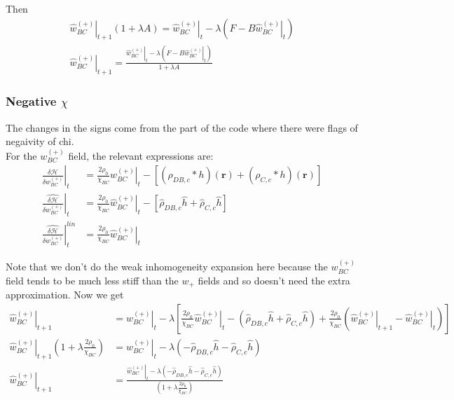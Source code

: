 \documentclass{article}
\begin{document}
  Then
  \begin{align*}
    \left. \hat{w}_{BC}^{(+)} \right|_{t+1} ( 1 + \lambda A ) =
      \left. \hat{w}_{BC}^{(+)} \right|_t
      - \lambda \left( F - B \left. \hat{w}_{BC}^{(+)} \right|_t \right) \\
    \left. \hat{w}_{BC}^{(+)} \right|_{t+1} =
    \frac{\left. \hat{w}_{BC}^{(+)} \right|_t - \lambda
            \left( F - B \left. \hat{w}_{BC}^{(+)} \right|_t \right)}
         {1 + \lambda A}
  \end{align*}
  
    \subsubsection{Negative $\chi$}
    The changes in the signs come from the part of the code where there were flags of negaivity of chi. \\
    For the $w_{BC}^{(+)}$ field, the relevant expressions are:
  \begin{align*}
    \left. \frac{\delta \mathcal{H}}{\delta  w_{BC}^{(+)} } \right|_t &=
      \frac{2\rho_0}{\chi_{BC}} \left. w_{BC}^{(+)} \right|_t
      -   [ (\rho_{DB,c} \ast h)(\mathbf{r})
            + (\rho_{C,c} \ast h)(\mathbf{r}) ] \\
      \left. \hat{\frac{\delta \mathcal{H}}{\delta w_{BC}^{(+)}}} \right|_t &=
      \frac{2\rho_0}{\chi_{BC}} \left. \hat{w}_{BC}^{(+)} \right|_t
      -   [ \hat{\rho}_{DB,c} \hat{h}
            + \hat{\rho}_{C,c} \hat{h} ] 
            \\
            \left.
            \hat{\frac{\delta \mathcal{H}}{\delta w_{BC}^{(+)}}}
            \right| ^{lin}_t &=
            \frac{2\rho_0}{\chi_{BC}} \left. \hat{w}_{BC}^{(+)} \right|_t
  \end{align*}
  
    Note that we don't do the weak inhomogeneity expansion here because the
  $w_{BC}^{(+)}$ field tends to be much less stiff than the $w_+$ fields and so
  doesn't need the extra approximation.
  Now we get
  \begin{align*}
  \left. \hat{w}_{BC}^{(+)} \right|_{t+1} &=
  \left. \hat{w}_{BC}^{(+)} \right|_t - \lambda \left[
  \frac{2\rho_0}{\chi_{BC}} \left. \hat{w}_{BC}^{(+)} \right|_t
  - ( \hat{\rho}_{DB,c} \hat{h}
  + \hat{\rho}_{C,c} \hat{h} )
  + \frac{2\rho_0}{\chi_{BC}}
  ( \left. \hat{w}_{BC}^{(+)}\right|_{t+1}
  - \left. \hat{w}_{BC}^{(+)} \right|_t
  )
  \right] \\
  \left. \hat{w}_{BC}^{(+)} \right|_{t+1} ( 1 + \lambda \frac{2
  	\rho_0}{\chi_{BC}} ) &=
  \left. \hat{w}_{BC}^{(+)} \right|_t - \lambda \left(
  - \hat{\rho}_{DB,c} \hat{h}
  - \hat{\rho}_{C,c} \hat{h}
  \right) \\
  \left. \hat{w}_{BC}^{(+)} \right|_{t+1} &=
  \frac{
  	\left. \hat{w}_{BC}^{(+)} \right|_t - \lambda \left(
  	- \hat{\rho}_{DB,c} \hat{h}
  	- \hat{\rho}_{C,c} \hat{h}
  	\right)
  }
  {
  	\left( 1 + \lambda \frac{2 \rho_0}{\chi_{BC}} \right)
  }
  \end{align*}
  
\end{document}
